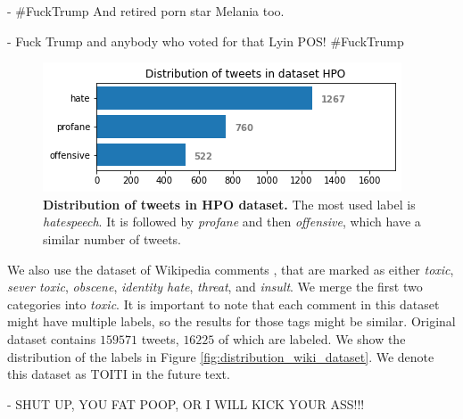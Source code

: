 \documentclass[fleqn,moreauthors,10pt]{ds_report}
\newcommand\bm{0.2pt}
\begin{document}
\begin{tcolorbox}[width=0.9\linewidth, center,arc=8pt,sharp corners=downhill, boxrule=0.3pt, left=\bm, top=\bm, right=\bm, bottom=\bm, fontupper=\small]
 - \#FuckTrump And retired porn star Melania too.
\end{tcolorbox}

\begin{tcolorbox}[width=0.9\linewidth, center,arc=8pt,sharp corners=downhill, boxrule=0.3pt, left=\bm, top=\bm, right=\bm, bottom=\bm, fontupper=\small]
 - Fuck Trump and anybody who voted for that Lyin POS!  \#FuckTrump
\end{tcolorbox}

\begin{figure}[ht]\centering
	\includegraphics[width=\linewidth]{distribution_tweets_hpo.png}
	\caption{\textbf{Distribution of tweets in HPO dataset.} The most used label is \textit{hatespeech}. It is followed by \textit{profane} and then \textit{offensive}, which have a similar number of tweets.}
	\label{fig:distribution_tweets_hpo}
\end{figure}

\noindent We also use the dataset of Wikipedia comments \cite{dixon2017ex}, that are marked as either \textit{toxic}, \textit{sever toxic}, \textit{obscene}, \textit{identity hate}, \textit{threat}, and \textit{insult}. We merge the first two categories into \textit{toxic}. It is important to note that each comment in this dataset might have multiple labels, so the results for those tags might be similar. Original dataset contains $159571$ tweets, $16225$ of which are labeled. We show the distribution of the labels in Figure \ref{fig:distribution_wiki_dataset}. We denote this dataset as TOITI in the future text.

\begin{tcolorbox}[width=0.9\linewidth, center,arc=8pt,sharp corners=downhill, boxrule=0.3pt, left=\bm, top=\bm, right=\bm, bottom=\bm, fontupper=\small]
 - SHUT UP, YOU FAT POOP, OR I WILL KICK YOUR ASS!!!
\end{tcolorbox}
\end{document}
